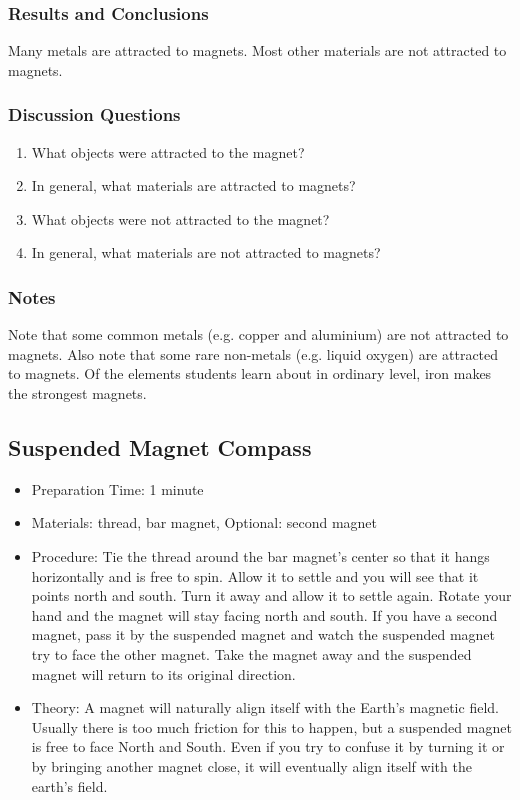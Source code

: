 \subsubsection*{Results and Conclusions}
Many metals are attracted to magnets. Most other materials are not attracted to magnets.


\subsubsection*{Discussion Questions}
\begin{enumerate}
\item{What objects were attracted to the magnet?}
\item{In general, what materials are attracted to magnets?}
\item{What objects were not attracted to the magnet?}
\item{In general, what materials are not attracted to magnets?}
\end{enumerate}

\subsubsection*{Notes}
Note that some common metals (e.g. copper and aluminium) are not attracted to magnets. Also note that some rare non-metals (e.g. liquid oxygen) are attracted to magnets. Of the elements students learn about in ordinary level, iron makes the strongest magnets.
	
	
\subsection{Suspended Magnet Compass}
\begin{itemize}
\item{Preparation Time: 1 minute}
\item{Materials: thread, bar magnet, Optional: second magnet}
\item{Procedure: Tie the thread around the bar magnet’s center so that it hangs horizontally and is free to spin. Allow it to settle and you will see that it points north and south. Turn it away and allow it to settle again. Rotate your hand and the magnet will stay facing north and south. If you have a second magnet, pass it by the suspended magnet and watch the suspended magnet try to face the other magnet. Take the magnet away and the suspended magnet will return to its original direction.}
\item{Theory: A magnet will naturally align itself with the Earth’s magnetic field. Usually there is too much friction for this to happen, but a suspended magnet is free to face North and South. Even if you try to confuse it by turning it or by bringing another magnet close, it will eventually align itself with the earth’s field.}
\end{itemize}
	

